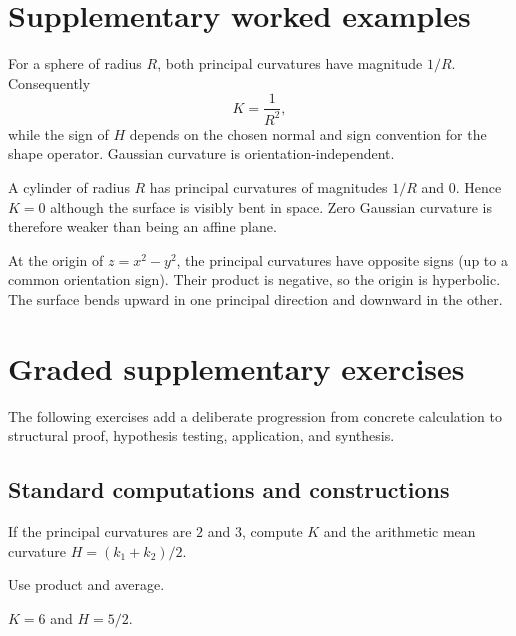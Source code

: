 \section{Supplementary worked examples}
\label{sec:vii17-pedagogy}

\begin{example}\label{ex:vii17-ped-01}
For a sphere of radius \(R\), both principal curvatures have magnitude \(1/R\).  Consequently
\[
K=\frac1{R^2},
\]
while the sign of \(H\) depends on the chosen normal and sign convention for the shape operator.  Gaussian curvature is orientation-independent.
\end{example}

\begin{example}\label{ex:vii17-ped-02}
A cylinder of radius \(R\) has principal curvatures of magnitudes \(1/R\) and \(0\).  Hence \(K=0\) although the surface is visibly bent in space.  Zero Gaussian curvature is therefore weaker than being an affine plane.
\end{example}

\begin{example}\label{ex:vii17-ped-03}
At the origin of \(z=x^2-y^2\), the principal curvatures have opposite signs (up to a common orientation sign).  Their product is negative, so the origin is hyperbolic.  The surface bends upward in one principal direction and downward in the other.
\end{example}

\section{Graded supplementary exercises}
The following exercises add a deliberate progression from concrete calculation to structural proof, hypothesis testing, application, and synthesis.

\subsection*{Standard computations and constructions}

\begin{exercise}\label{exr:vii17-ped-01}
If the principal curvatures are \(2\) and \(3\), compute \(K\) and the arithmetic mean curvature \(H=(k_1+k_2)/2\).
\end{exercise}
\begin{hint}
Use product and average.
\end{hint}
\begin{solution}
\(K=6\) and \(H=5/2\).
\end{solution}

